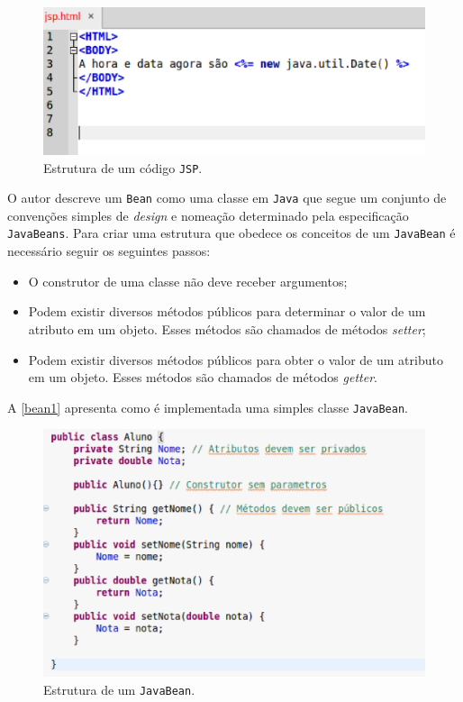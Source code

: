 \begin{figure}[h]
	\centering
	\caption{\label{jsp}Estrutura de um código \texttt{JSP}.}
		\includegraphics[keepaspectratio=true,scale=0.7]{figuras/jsp.eps}
\end{figure}

O autor \cite{paulojsp} descreve um \texttt{Bean} como uma classe em \texttt{Java} que segue um conjunto de convenções simples de \textit{design}
e nomeação determinado pela especificação \texttt{JavaBeans}. Para criar uma estrutura que obedece os conceitos de um \texttt{JavaBean} é necessário
seguir os seguintes passos:

\begin{itemize}

	\item O construtor de uma classe não deve receber argumentos;
	\item Podem existir diversos métodos públicos para determinar o valor de um atributo em um objeto. Esses métodos são chamados 
	de métodos \textit{setter};
	\item Podem existir diversos métodos públicos para obter o valor de um atributo em um objeto. Esses métodos são chamados de 
	métodos \textit{getter}.

\end{itemize}

A \autoref{bean1} apresenta como é implementada uma simples classe \texttt{JavaBean}.

\begin{figure}[h]
	\centering
	\caption{\label{bean1}Estrutura de um \texttt{JavaBean}.}
		\includegraphics[keepaspectratio=true,scale=0.5]{figuras/bean1.eps}
\end{figure}

